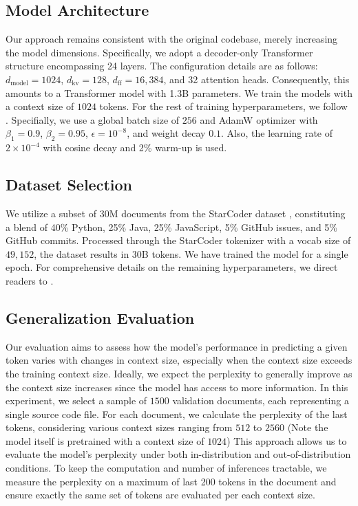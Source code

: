 \documentclass{article}
\begin{document}
\subsection{Model Architecture}

Our approach remains consistent with the original codebase, merely increasing the model dimensions. Specifically, we adopt a decoder-only Transformer structure encompassing 24 layers. The configuration details are as follows: $d_\mathrm{model}=1024$, $d_\mathrm{kv}=128$, $d_\mathrm{ff}=16,384$, and 32 attention heads. Consequently, this amounts to a Transformer model with 1.3B parameters. We train the models with a context size of $1024$ tokens. 
For the rest of training hyperparameters, we follow \citet{Allal2023:SantaCoder}. Specifially, we use a global batch size of $256$ and AdamW optimizer with $\beta_1=0.9$, $\beta_2=0.95$, $\epsilon = 10^{-8}$, and weight decay $0.1$. Also, the learning rate of $2\times 10^{-4}$ with cosine decay and 2\% warm-up is used.

\subsection{Dataset Selection}
We utilize a subset of 30M documents from the StarCoder dataset \citep{Li2023:Starcoder}, constituting a blend of 40\% Python, 25\% Java, 25\% JavaScript, 5\% GitHub issues, and 5\% GitHub commits. Processed through the StarCoder tokenizer with a vocab size of $49,152$, the dataset results in 30B tokens. We have trained the model for a single epoch. For comprehensive details on the remaining hyperparameters, we direct readers to \citet{Allal2023:SantaCoder}.

\subsection{Generalization Evaluation}
Our evaluation aims to assess how the model's performance in predicting a given token varies with changes in context size, especially when the context size exceeds the training context size. Ideally, we expect the perplexity to generally improve as the context size increases since the model has access to more information. 
In this experiment, we select a sample of $1500$ validation documents, each representing a single source code file. For each document, we calculate the perplexity of the last tokens, considering various context sizes ranging from $512$ to $2560$ (Note the model itself is pretrained with a context size of $1024$)
This approach allows us to evaluate the model's perplexity under both in-distribution and out-of-distribution conditions.
To keep the computation and number of inferences tractable, we measure the perplexity on a maximum of last 200 tokens in the document and ensure exactly the same set of tokens are evaluated per each context size.
\end{document}
